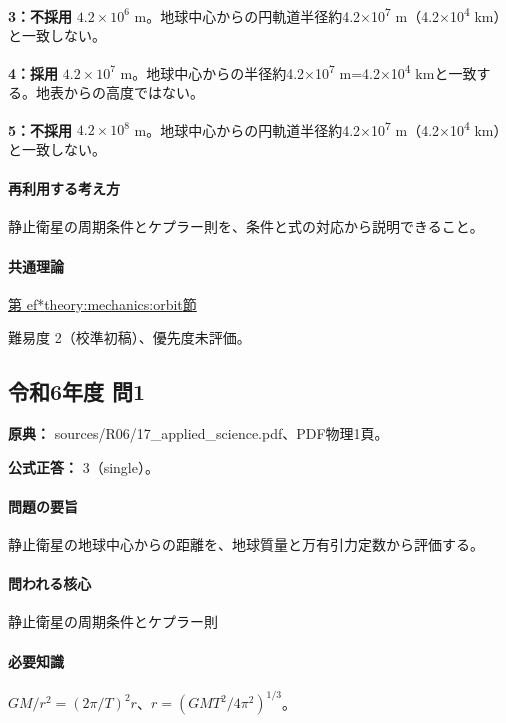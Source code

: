 \noindent\textbf{3：不採用} \(4.2\times10^6\) m。地球中心からの円軌道半径約4.2×10\textsuperscript{7} m（4.2×10\textsuperscript{4} km）と一致しない。\par

\noindent\textbf{4：採用} \(4.2\times10^7\) m。地球中心からの半径約4.2×10\textsuperscript{7} m=4.2×10\textsuperscript{4} kmと一致する。地表からの高度ではない。\par

\noindent\textbf{5：不採用} \(4.2\times10^8\) m。地球中心からの円軌道半径約4.2×10\textsuperscript{7} m（4.2×10\textsuperscript{4} km）と一致しない。\par

\paragraph{再利用する考え方} 静止衛星の周期条件とケプラー則を、条件と式の対応から説明できること。

\paragraph{共通理論} \hyperref[theory:mechanics:orbit]{第
ef*{theory:mechanics:orbit}節}

\par 難易度 2（校準初稿）、優先度未評価。

\subsection{令和6年度 問1}
\label{q:r06-reg-applied-01}

\noindent\textbf{原典：} sources/R06/17\_applied\_science.pdf、PDF物理1頁。

\textbf{公式正答：} 3（single）。

\paragraph{問題の要旨} 静止衛星の地球中心からの距離を、地球質量と万有引力定数から評価する。

\paragraph{問われる核心} 静止衛星の周期条件とケプラー則

\paragraph{必要知識} \(GM/r^2=(2\pi/T)^2r\)、\(r=(GMT^2/4\pi^2)^{1/3}\)。


